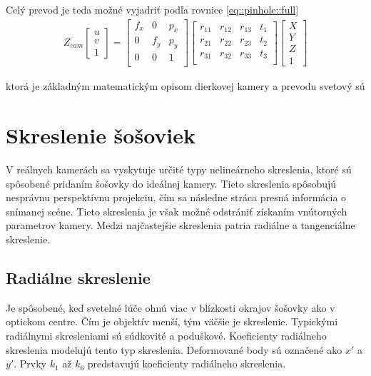 Celý prevod je teda možné vyjadriť podľa rovnice \ref{eq::pinhole::full} 
\begin{equation}
\label{eq::pinhole::full}
\begin{aligned}
Z_{cam}
\begin{bmatrix}
u \\ v \\ 1
\end{bmatrix}
=
\begin{bmatrix}
f_x & 0 & p_x \\
0 & f_y & p_y \\
0 & 0 & 1 \\
\end{bmatrix}
\begin{bmatrix}
r_{11} & r_{12} & r_{13} & t_{1} \\
r_{21} & r_{22} & r_{23} & t_{2} \\
r_{31} & r_{32} & r_{33} & t_{3} \\
\end{bmatrix}
\begin{bmatrix}
X \\ Y \\ Z \\ 1
\end{bmatrix}
\end{aligned}
\end{equation}

ktorá je základným matematickým opisom dierkovej kamery a prevodu svetový sú

\section{Skreslenie šošoviek}

V reálnych kamerách sa vyskytuje určité typy nelineárneho skreslenia, ktoré sú spôsobené pridaním šošovky do ideálnej kamery. Tieto skreslenia spôsobujú nesprávnu perspektívnu projekciu, čím sa následne stráca presná informácia o snímanej scéne. Tieto skreslenia je však možné odstrániť získaním vnútorných parametrov kamery. Medzi najčastejšie skreslenia patria radiálne a tangenciálne skreslenie. 

\subsection{Radiálne skreslenie}
Je spôsobené, keď svetelné lúče ohnú viac v blízkosti okrajov šošovky ako v optickom centre. Čím je objektív menší, tým väčšie je skreslenie. Typickými radiálnymi skresleniami sú súdkovité a poduškové. Koeficienty radiálneho skreslenia modelujú tento typ skreslenia. Deformované body sú označené ako $x'$ a $y'$. Prvky $k_1$ až $k_6$ predstavujú koeficienty radiálneho skreslenia. 

